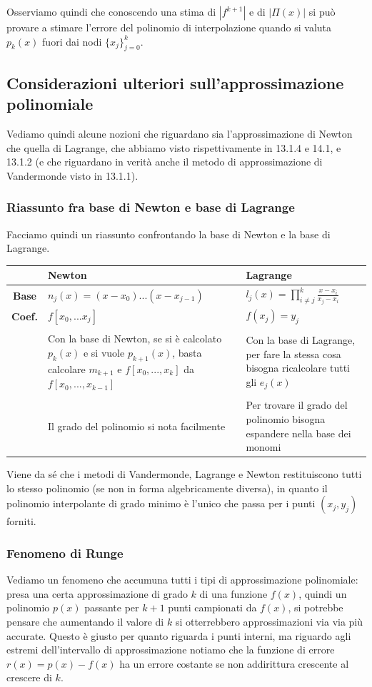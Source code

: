 \documentclass[a4paper,11pt]{article}
\begin{document}
Osserviamo quindi che conoscendo una stima di $|f^{k + 1}|$ e  di $|\Pi(x)|$ si può provare a stimare l'errore del polinomio di interpolazione quando si valuta $p_k(x)$ fuori dai nodi $\{ x_j \}_{j=0}^k$.

\subsection{Considerazioni ulteriori sull'approssimazione polinomiale}
Vediamo quindi alcune nozioni che riguardano sia l'approssimazione di Newton che quella di Lagrange, che abbiamo visto rispettivamente in 13.1.4 e 14.1, e 13.1.2 (e che riguardano in verità anche il metodo di approssimazione di Vandermonde visto in 13.1.1).

\subsubsection{Riassunto fra base di Newton e base di Lagrange}
Facciamo quindi un riassunto confrontando la base di Newton e la base di Lagrange.
\begin{table}[h!]
	\center 
	\begin{tabular} { c p{6cm} | p{6cm} }
		& \bfseries Newton & \bfseries Lagrange \\
		\hline
		\bfseries Base & $n_j(x) = (x - x_0) ... (x - x_{j - 1}) $ & $l_j(x) = \prod_{i \neq j}^k \frac{x - x_i}{x_j - x_i}$ \\
		\bfseries Coef. & $f[x_0, ... x_j]$ & $f(x_j) = y_j$ \\ & \\
		& Con la base di Newton, se si è calcolato $p_k(x)$ e si vuole $p_{k + 1}(x)$, basta calcolare $m_{k + 1}$ e $f[x_0, ..., x_{k}]$ da $f[x_0, ..., x_{k - 1}]$ &
		Con la base di Lagrange, per fare la stessa cosa bisogna ricalcolare tutti gli $e_j(x)$ \\ & \\
		& Il grado del polinomio si nota facilmente & Per trovare il grado del polinomio bisogna espandere nella base dei monomi
	\end{tabular}
\end{table}

Viene da sé che i metodi di Vandermonde, Lagrange e Newton restituiscono tutti lo stesso polinomio (se non in forma algebricamente diversa), in quanto il polinomio interpolante di grado minimo è l'unico che passa per i punti $(x_j, y_j)$ forniti.

\subsubsection{Fenomeno di Runge}
Vediamo un fenomeno che accumuna tutti i tipi di approssimazione polinomiale: presa una certa approssimazione di grado $k$ di una funzione $f(x)$, quindi un polinomio $p(x)$ passante per $k + 1$ punti campionati da $f(x)$, si potrebbe pensare che aumentando il valore di $k$ si otterrebbero approssimazioni via via più accurate.
Questo è giusto per quanto riguarda i punti interni, ma riguardo agli estremi dell'intervallo di approssimazione notiamo che la funzione di errore $r(x) = p(x) - f(x)$ ha un errore costante se non addirittura crescente al crescere di $k$.
\end{document}
